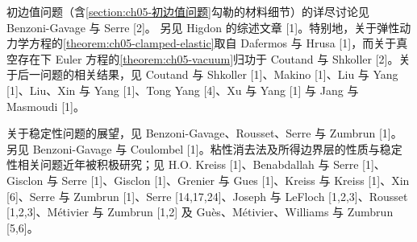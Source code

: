 \documentclass[../../main.tex]{subfiles}
\begin{document}
初边值问题（含\cref{section:ch05-初边值问题}勾勒的材料细节）的详尽讨论见 Benzoni-Gavage 与 Serre [2]。
另见 Higdon 的综述文章 [1]。特别地，关于弹性动力学方程的\cref{theorem:ch05-clamped-elastic}取自 Dafermos 与 Hrusa [1]，而关于真空存在下 Euler 方程的\cref{theorem:ch05-vacuum}归功于 Coutand 与 Shkoller [2]。关于后一问题的相关结果，见 Coutand 与 Shkoller [1]、Makino [1]、Liu 与 Yang [1]、Liu、Xin 与 Yang [1]、Tong Yang [4]、Xu 与 Yang [1] 与 Jang 与 Masmoudi [1]。

关于稳定性问题的展望，见 Benzoni-Gavage、Rousset、Serre 与 Zumbrun [1]。另见 Benzoni-Gavage 与 Coulombel [1]。粘性消去法及所得边界层的性质与稳定性相关问题近年被积极研究；见 H.O. Kreiss [1]、Benabdallah 与 Serre [1]、Gisclon 与 Serre [1]、Gisclon [1]、Grenier 与 Gues [1]、Kreiss 与 Kreiss [1]、Xin [6]、Serre 与 Zumbrun [1]、Serre [14,17,24]、Joseph 与 LeFloch [1,2,3]、Rousset [1,2,3]、Métivier 与 Zumbrun [1,2] 及 Guès、Métivier、Williams 与 Zumbrun [5,6]。
\end{document}
